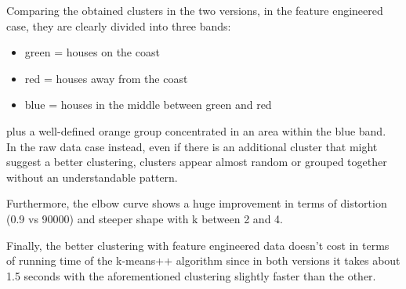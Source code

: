 \documentclass[11pt]{article}
\begin{document}
\newpage
Comparing the obtained clusters in the two versions, in the feature engineered case, they are clearly divided into three bands:

\begin{itemize}
  \item green = houses on the coast
  \item red = houses away from the coast
  \item blue = houses in the middle between green and red
\end{itemize}

plus a well-defined orange group concentrated in an area within the blue band. \\
In the raw data case instead, even if there is an additional cluster that might suggest a better clustering,
clusters appear almost random or grouped together without an understandable pattern.

\bigskip
Furthermore, the elbow curve shows a huge improvement in terms of distortion (0.9 vs 90000) and steeper shape with k between 2 and 4.

\bigskip
Finally, the better clustering with feature engineered data doesn't cost in terms of running time of the k-means++ algorithm since
in both versions it takes about 1.5 seconds with the aforementioned clustering slightly faster than the other.
\end{document}
